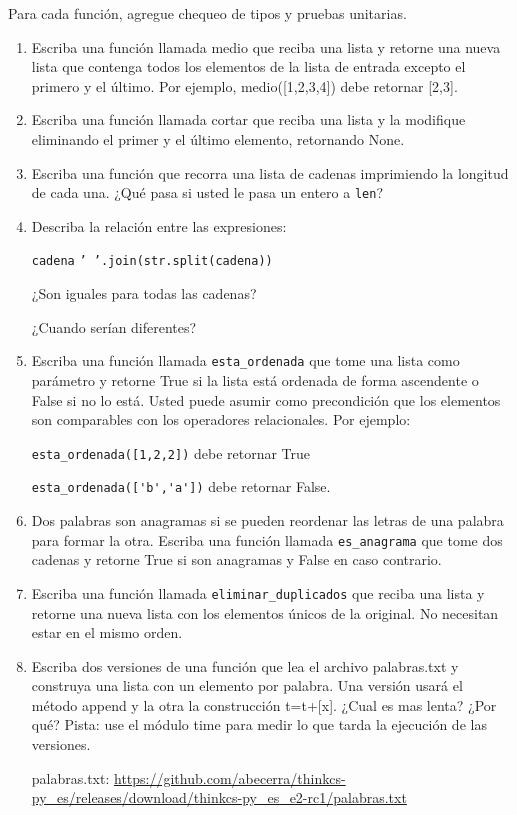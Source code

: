 Para cada función, agregue chequeo de tipos y pruebas unitarias.
\begin{enumerate}
\item Escriba una función llamada medio que reciba una lista y retorne una
nueva lista que contenga todos los elementos de la lista de entrada
excepto el primero y el último. Por ejemplo, medio({[}1,2,3,4{]})
debe retornar {[}2,3{]}.
\item Escriba una función llamada cortar que reciba una lista y la modifique
eliminando el primer y el último elemento, retornando None.
\item Escriba una función que recorra una lista de cadenas imprimiendo la
longitud de cada una. ¿Qué pasa si usted le pasa un entero a \texttt{len}?
\item Describa la relación entre las expresiones:

\texttt{cadena} \hfill{}\texttt{' '.join(str.split(cadena))}

¿Son iguales para todas las cadenas?

¿Cuando serían diferentes?
\item Escriba una función llamada \verb+esta_ordenada+ que tome una lista
como parámetro y retorne True si la lista está ordenada de forma ascendente
o False si no lo está. Usted puede asumir como precondición que los
elementos son comparables con los operadores relacionales. Por ejemplo:

\verb+esta_ordenada([1,2,2])+ debe retornar True

\verb+esta_ordenada(['b','a'])+ debe retornar False.
\item Dos palabras son anagramas si se pueden reordenar las letras de una
palabra para formar la otra. Escriba una función llamada \verb+es_anagrama+
que tome dos cadenas y retorne True si son anagramas y False en caso
contrario.
\item Escriba una función llamada \verb+eliminar_duplicados+ que reciba
una lista y retorne una nueva lista con los elementos únicos de la
original. No necesitan estar en el mismo orden.
\item Escriba dos versiones de una función que lea el archivo palabras.txt
y construya una lista con un elemento por palabra. Una versión usará
el método append y la otra la construcción t=t+{[}x{]}. ¿Cual es mas
lenta? ¿Por qué? Pista: use el módulo time para medir lo que tarda
la ejecución de las versiones.

palabras.txt: \url{https://github.com/abecerra/thinkcs-py_es/releases/download/thinkcs-py_es_e2-rc1/palabras.txt}


\end{enumerate}

